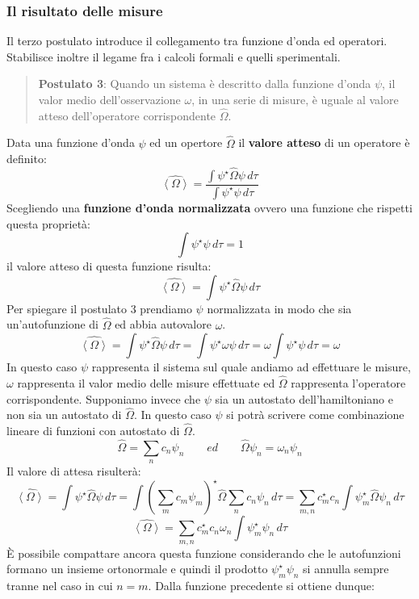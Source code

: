 \subsubsection{Il risultato delle misure}
Il terzo postulato introduce il collegamento tra funzione d'onda ed operatori. Stabilisce inoltre il legame fra i calcoli formali e quelli sperimentali.
\begin{quote}
\textbf{Postulato 3}: Quando un sistema è descritto dalla funzione d'onda $\psi$, il valor medio dell'osservazione $\omega$, in una serie di misure, è uguale al valore atteso dell'operatore corrispondente $\hat{\Omega}$.
\end{quote}
Data una funzione d'onda $\psi$ ed un opertore $\hat{\Omega}$ il \textbf{valore atteso} di un operatore è definito:
$$\hat{\left \langle \Omega \right \rangle} = \frac{ \int \psi^{\star} \hat{\Omega} \psi \,d\tau }{ \int \psi^{\star} \psi \,d\tau }$$
Scegliendo una \textbf{funzione d'onda normalizzata} ovvero una funzione che rispetti questa proprietà:
$$\int \psi^{\star} \psi \,d\tau = 1$$
il valore atteso di questa funzione risulta:
$$\hat{\left \langle \Omega \right \rangle} = \int \psi^{\star} \hat{\Omega} \psi \,d\tau$$
Per spiegare il postulato 3 prendiamo $\psi$ normalizzata in modo che sia un'autofunzione di $\hat{\Omega}$ ed abbia autovalore $\omega$.
$$\hat{\left \langle \Omega \right \rangle} = \int \psi^{\star} \hat{\Omega} \psi \,d\tau = \int \psi^{\star} \omega \psi \,d\tau = \omega \int \psi^{\star} \psi \,d\tau = \omega$$
In questo caso $\psi$ rappresenta il sistema sul quale andiamo ad effettuare le misure, $\omega$ rappresenta il valor medio delle misure effettuate ed $\hat{\Omega}$ rappresenta l'operatore corrispondente.
Supponiamo invece che $\psi$ sia un autostato dell'hamiltoniano e non sia un autostato di $\hat{\Omega}$. In questo caso $\psi$ si potrà scrivere come combinazione lineare di funzioni con autostato di $\hat{\Omega}$.
$$\hat{\Omega} = \sum_n c_n \psi_n \qquad ed \qquad \hat{\Omega} \psi_n = \omega_n \psi_n$$
Il valore di attesa risulterà:
$$\hat{\left \langle \Omega \right \rangle} = \int \psi^{\star} \hat{\Omega} \psi \,d\tau = \int {\left(\sum_m c_m \psi_m\right)}^{\star} \hat{\Omega} \sum_n c_n \psi_n \,d\tau = \sum_{m,n} c_m^{\star} c_n \int \psi_m^{\star} \hat{\Omega} \psi_n \, d\tau$$
$$\hat{\left \langle \Omega \right \rangle} = \sum_{m,n} c_m^{\star} c_n \omega_n \int \psi_m^{\star} \psi_n \, d\tau$$
È possibile compattare ancora questa funzione considerando che le autofunzioni formano un insieme ortonormale e quindi il prodotto $\psi_m^{\star} \psi_n$ si annulla sempre tranne nel caso in cui $n = m$. Dalla funzione precedente si ottiene dunque:
